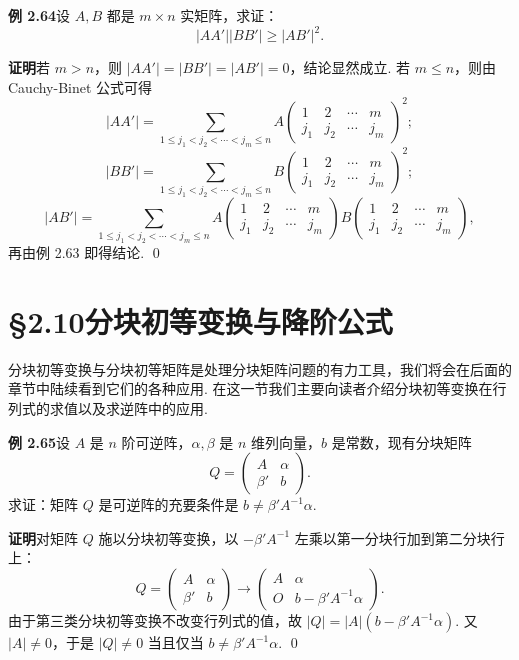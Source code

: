 \documentclass[UTF8, 12pt, fontset=fandol, oneside]{ctexart}
\begin{document}
\noindent\textbf{例 2.64}\quad 设 $A,B$ 都是 $m\times n$ 实矩阵，求证：
\[
|AA'||BB'|\ge |AB'|^2.
\]

\noindent\textbf{证明}\quad 若 $m>n$，则 $|AA'|=|BB'|=|AB'|=0$，结论显然成立.
若 $m\le n$，则由 Cauchy-Binet 公式可得
\[
|AA'|=\sum_{1\le j_1<j_2<\cdots<j_m\le n}
A\left(
\begin{array}{cccc}
1 & 2 & \cdots & m\\
j_1 & j_2 & \cdots & j_m
\end{array}
\right)^2;
\]
\[
|BB'|=\sum_{1\le j_1<j_2<\cdots<j_m\le n}
B\left(
\begin{array}{cccc}
1 & 2 & \cdots & m\\
j_1 & j_2 & \cdots & j_m
\end{array}
\right)^2;
\]
\[
|AB'|=\sum_{1\le j_1<j_2<\cdots<j_m\le n}
A\left(
\begin{array}{cccc}
1 & 2 & \cdots & m\\
j_1 & j_2 & \cdots & j_m
\end{array}
\right)
B\left(
\begin{array}{cccc}
1 & 2 & \cdots & m\\
j_1 & j_2 & \cdots & j_m
\end{array}
\right),
\]
再由例 2.63 即得结论. \qed

\section*{§2.10\quad 分块初等变换与降阶公式}

分块初等变换与分块初等矩阵是处理分块矩阵问题的有力工具，我们将会在后面的章节中陆续看到它们的各种应用. 在这一节我们主要向读者介绍分块初等变换在行列式的求值以及求逆阵中的应用.

\noindent\textbf{例 2.65}\quad 设 $A$ 是 $n$ 阶可逆阵，$\alpha,\beta$ 是 $n$ 维列向量，$b$ 是常数，现有分块矩阵
\[
Q=
\left(
\begin{array}{cc}
A & \alpha\\
\beta' & b
\end{array}
\right).
\]
求证：矩阵 $Q$ 是可逆阵的充要条件是 $b\ne \beta'A^{-1}\alpha$.

\noindent\textbf{证明}\quad 对矩阵 $Q$ 施以分块初等变换，以 $-\beta'A^{-1}$ 左乘以第一分块行加到第二分块行上：
\[
Q=
\left(
\begin{array}{cc}
A & \alpha\\
\beta' & b
\end{array}
\right)
\to
\left(
\begin{array}{cc}
A & \alpha\\
O & b-\beta'A^{-1}\alpha
\end{array}
\right).
\]
由于第三类分块初等变换不改变行列式的值，故 $|Q|=|A|(b-\beta'A^{-1}\alpha)$. 又 $|A|\ne0$，于是 $|Q|\ne0$ 当且仅当 $b\ne\beta'A^{-1}\alpha$. \qed
\end{document}
